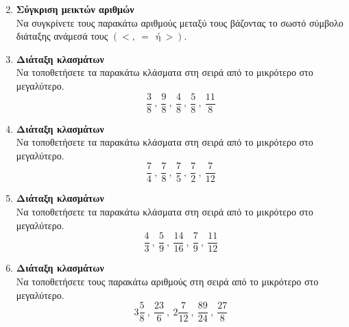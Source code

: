 \documentclass[twoside,nofonts,internet]{askhseis}
\begin{document}
\begin{enumerate}
\begin{multicols}{3}
\end{multicols}
\item \textbf{Σύγκριση μεικτών αριθμών}\\
Να συγκρίνετε τους παρακάτω αριθμούς μεταξύ τους βάζοντας το σωστό σύμβολο διάταξης ανάμεσά τους $ (<,\ =\ \ \textrm{ή}\ >) $.
\begin{multicols}{3}
\end{multicols}
\item \textbf{Διάταξη κλασμάτων}\\
Να τοποθετήσετε τα παρακάτω κλάσματα στη σειρά από το μικρότερο στο μεγαλύτερο.
\[ \frac{3}{8}\ ,\ \frac{9}{8}\ ,\ \frac{4}{8}\ ,\ \frac{5}{8}\ ,\ \dfrac{11}{8} \]
\item \textbf{Διάταξη κλασμάτων}\\
Να τοποθετήσετε τα παρακάτω κλάσματα στη σειρά από το μικρότερο στο μεγαλύτερο.
\[ \frac{7}{4}\ ,\ \frac{7}{8}\ ,\ \frac{7}{5}\ ,\ \frac{7}{2}\ ,\ \dfrac{7}{12} \]
\item \textbf{Διάταξη κλασμάτων}\\
Να τοποθετήσετε τα παρακάτω κλάσματα στη σειρά από το μικρότερο στο μεγαλύτερο.
\[ \frac{4}{3}\ ,\ \frac{5}{9}\ ,\ \frac{14}{16}\ ,\ \frac{7}{9}\ ,\ \dfrac{11}{12} \]
\item \textbf{Διάταξη κλασμάτων}\\
Να τοποθετήσετε τους παρακάτω αριθμούς στη σειρά από το μικρότερο στο μεγαλύτερο.
\[ 3\frac{5}{8}\ ,\ \frac{23}{6}\ ,\ 2\frac{7}{12}\ ,\ \frac{89}{24}\ ,\ \dfrac{27}{8} \]
\end{enumerate}
\end{document}
